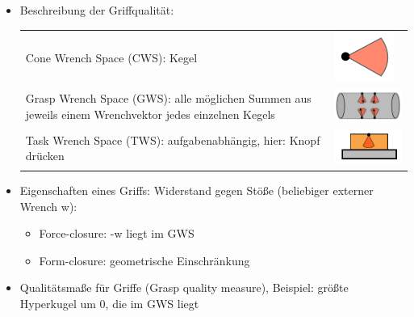 \begin{itemize}
\item Beschreibung der Griffqualität:\\
\begin{tabular}{p{12cm}p{3cm}}
Cone Wrench Space (CWS): Kegel & \includegraphics[width=.5\linewidth]{figures/ch04_cws.png}\\ 
Grasp Wrench Space (GWS): alle möglichen Summen aus jeweils einem Wrenchvektor jedes einzelnen Kegels & \includegraphics[width=.5\linewidth]{figures/ch04_gws.png}\\
Task Wrench Space (TWS): aufgabenabhängig, hier: Knopf drücken & \includegraphics[width=.5\linewidth]{figures/ch04_tws.png}
\end{tabular}
\item Eigenschaften eines Griffs: Widerstand gegen Stöße (beliebiger externer Wrench w):
\begin{itemize}
\item Force-closure: -w liegt im GWS
\item Form-closure: geometrische Einschränkung
\end{itemize}
\item Qualitätsmaße für Griffe (Grasp quality measure), Beispiel: größte Hyperkugel um 0, die im GWS liegt
\end{itemize}
